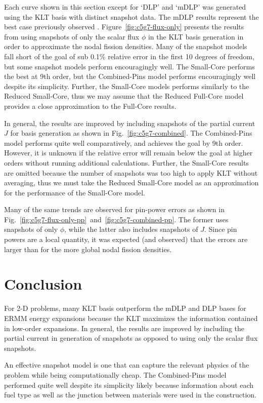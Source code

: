 \documentclass{anstrans}
\newcommand{\FIG}[1]{Fig.~\ref{#1}}               %
\newcommand{\FIGS}[2]{Fig.~\ref{#1}~and~\ref{#2}} %
\newcommand{\FIGURE}[1]{Figure~\ref{#1}}
\begin{document}
Each curve shown in this section except for `DLP' and `mDLP' was
generated using the KLT basis with distinct snapshot data. The mDLP results
represent the best case previously observed \cite{Roberts2014}.
\FIGURE{fig:c5g7-flux-only} presents the results from using snapshots of only
the scalar flux $\phi$ in the KLT basis generation in order to approximate the
nodal fission densities.  Many of the snapshot models fall short of the goal of
sub 0.1\% relative error in the first 10 degrees of freedom, but some snapshot
models perform encouragingly well. The Small-Core performs the best at
9th order, but the Combined-Pins model performs encouragingly well despite its
simplicity.  Further, the Small-Core models performs similarly to the Reduced
Small-Core, thus we may assume that the Reduced Full-Core model provides a
close approximation to the Full-Core results.

In general, the results are improved by including snapshots of the partial
current $J$ for basis generation as shown in \FIG{fig:c5g7-combined}.  The
Combined-Pins model performs quite well comparatively, and achieves the goal by
9th order.  However, it is unknown if the relative error will remain below the
goal at higher orders without running additional calculations.  Further, the
Small-Core results are omitted because the number of snapshots was too high to
apply KLT without averaging, thus we must take the Reduced Small-Core model as
an approximation for the performance of the Small-Core model.

Many of the same trends are observed for pin-power errors as shown in
\FIGS{fig:c5g7-flux-only-pp}{fig:c5g7-combined-pp}.  The
former uses snapshots of only $\phi$, while the latter also includes
snapshots of $J$.  Since pin powers are a local quantity, it
was expected (and observed) that the errors are larger than for the more global
nodal fission densities.

\section{Conclusion}

For 2-D problems, many KLT basis outperform the mDLP and DLP bases for ERMM
energy expansions because the KLT maximizes the information contained in
low-order expansions.  In general, the results are
improved by including the partial current in generation of snapshots as
opposed to using only the scalar flux snapshots.

An effective snapshot model is one that can capture the relevant physics of
the problem while being computationally cheap.  The Combined-Pins
model performed quite well despite its simplicity likely because information
about each fuel type as well as the junction between materials were used in
the construction.
\end{document}
